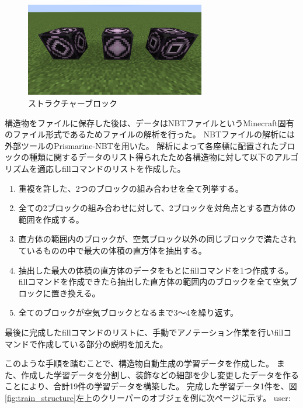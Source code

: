 \begin{figure}[H]
    \centering
    \includegraphics[width=0.7\textwidth]{fig/structure_block.png}
    \caption{ストラクチャーブロック}
    \label{fig:structure_block}
\end{figure}

構造物をファイルに保存した後は、データはNBTファイルというMinecraft固有のファイル形式であるためファイルの解析を行った。
NBTファイルの解析には外部ツールのPrismarine-NBT\cite{bib:prismarine-nbt}を用いた。
解析によって各座標に配置されたブロックの種類に関するデータのリスト得られたため各構造物に対して以下のアルゴリズムを適応しfillコマンドのリストを作成した。

\begin{enumerate}
    \item 重複を許した、2つのブロックの組み合わせを全て列挙する。
    \item 全ての2ブロックの組み合わせに対して、2ブロックを対角点とする直方体の範囲を作成する。
    \item 直方体の範囲内のブロックが、空気ブロック以外の同じブロックで満たされているものの中で最大の体積の直方体を抽出する。
    \item 抽出した最大の体積の直方体のデータをもとにfillコマンドを1つ作成する。fillコマンドを作成できたら抽出した直方体の範囲内のブロックを全て空気ブロックに置き換える。
    \item 全てのブロックが空気ブロックとなるまで3～4を繰り返す。
\end{enumerate}

最後に完成したfillコマンドのリストに、手動でアノテーション作業を行いfillコマンドで作成している部分の説明を加えた。

このような手順を踏むことで、構造物自動生成の学習データを作成した。
また、作成した学習データを分割し、装飾などの細部を少し変更したデータを作ることにより、合計19件の学習データを構築した。
完成した学習データ1件を、図\ref{fig:train_structure}左上のクリーパーのオブジェを例に次ページに示す。
\newpage
\noindent
user:

\noindent
{}

